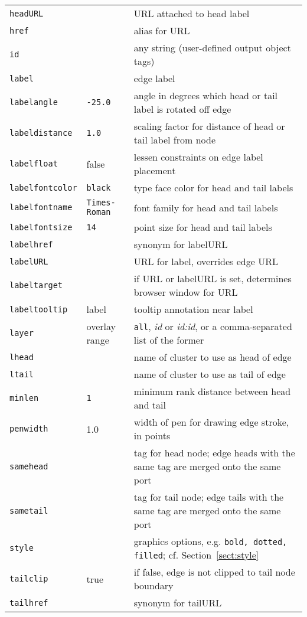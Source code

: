 \documentclass[11pt]{article}
\begin{document}
{{\begin{tabular}[t]{|l|l|p{3.5in}|}
{\tt headURL} & & URL attached to head label \\
{\tt href} & & alias for URL \\
{\tt id} & & any string (user-defined output object tags) \\
{\tt label} & & edge label \\
{\tt labelangle} & {\tt -25.0} & angle in degrees which head or tail label
is rotated off edge \\
{\tt labeldistance} & {\tt 1.0} & scaling factor for distance of head or tail label from node \\
{\tt labelfloat} & false & lessen constraints on edge label placement \\
{\tt labelfontcolor} & {\tt black} & type face color for head and tail labels\\
{\tt labelfontname} & {\tt Times-Roman} & font family for head and tail labels\\
{\tt labelfontsize} & {\tt 14} & point size for head and tail labels \\
{\tt labelhref} & & synonym for labelURL \\
{\tt labelURL} & & URL for label, overrides edge URL \\
{\tt labeltarget} & & if URL or labelURL is set, determines browser window for URL \\
{\tt labeltooltip} & label & tooltip annotation near label \\
{\tt layer} & overlay range & {\tt all}, {\it id} or {\it id:id}, or a comma-separated
list of the former\\
{\tt lhead} & & name of cluster to use as head of edge \\
{\tt ltail} & & name of cluster to use as tail of edge \\
{\tt minlen} & {\tt 1} & minimum rank distance between head and tail \\
{\tt penwidth} & 1.0 & width of pen for drawing edge stroke, in points \\
{\tt samehead} & & tag for head node; edge heads with the same tag are merged onto
the same port \\
{\tt sametail} & & tag for tail node; edge tails with the same tag are merged onto
the same port \\
{\tt style} & & graphics options, e.g. {\tt bold, dotted, filled}; cf.
Section~\ref{sect:style} \\ 
{\tt tailclip} & true & if false, edge is not clipped to tail node boundary \\
{\tt tailhref} & & synonym for tailURL \\

\end{tabular}}}
\end{document}
